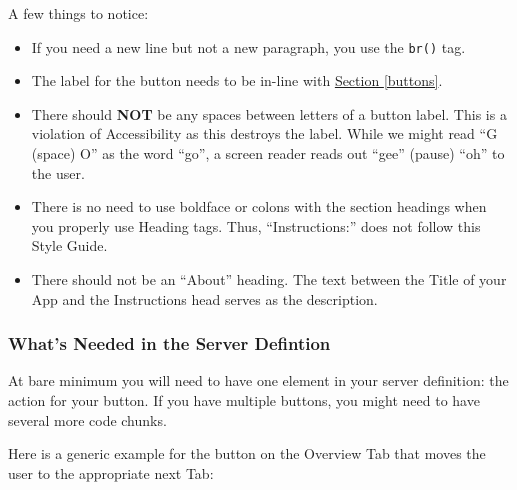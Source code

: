 \documentclass[
]{book}
\newenvironment{Shaded}{\begin{snugshade}}{\end{snugshade}}
\newcommand{\CommentTok}[1]{\textcolor[rgb]{0.56,0.35,0.01}{\textit{#1}}}
\newcommand{\DataTypeTok}[1]{\textcolor[rgb]{0.13,0.29,0.53}{#1}}
\newcommand{\KeywordTok}[1]{\textcolor[rgb]{0.13,0.29,0.53}{\textbf{#1}}}
\newcommand{\NormalTok}[1]{#1}
\newcommand{\OperatorTok}[1]{\textcolor[rgb]{0.81,0.36,0.00}{\textbf{#1}}}
\newcommand{\StringTok}[1]{\textcolor[rgb]{0.31,0.60,0.02}{#1}}
\providecommand{\tightlist}{%
  \setlength{\itemsep}{0pt}\setlength{\parskip}{0pt}}
\begin{document}
A few things to notice:

\begin{itemize}
\tightlist
\item
  If you need a new line but not a new paragraph, you use the \texttt{br()} tag.
\item
  The label for the button needs to be in-line with \protect\hyperlink{buttons}{Section \ref{buttons}}.
\item
  There should \textbf{NOT} be any spaces between letters of a button label. This is a violation of Accessibility as this destroys the label. While we might read ``G (space) O'' as the word ``go'', a screen reader reads out ``gee'' (pause) ``oh'' to the user.
\item
  There is no need to use boldface or colons with the section headings when you properly use Heading tags. Thus, ``Instructions:'' does not follow this Style Guide.
\item
  There should not be an ``About'' heading. The text between the Title of your App and the Instructions head serves as the description.
\end{itemize}

\hypertarget{whats-needed-in-the-server-defintion-1}{%
\subsubsection{What's Needed in the Server Defintion}\label{whats-needed-in-the-server-defintion-1}}

At bare minimum you will need to have one element in your server definition: the action for your button. If you have multiple buttons, you might need to have several more code chunks.

Here is a generic example for the button on the Overview Tab that moves the user to the appropriate next Tab:

\begin{Shaded}
\end{Shaded}
\end{document}

